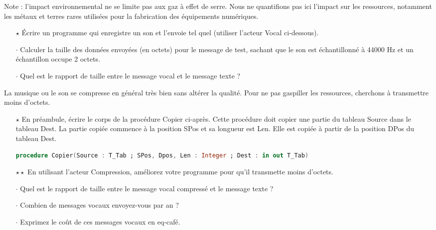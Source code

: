 \medskip

Note : l'impact environnemental ne se limite pas aux gaz à effet de serre. Nous ne quantifions pas ici l'impact sur les ressources, notamment les métaux et terres rares
utilisées pour la fabrication des équipements numériques.



\begin{itemize}
\item[$\star$] Écrire un programme qui enregistre un son et l'envoie tel quel (utiliser l'acteur Vocal ci-dessous).
\item[$\cdot$] Calculer la taille des données envoyées (en octets) pour le message de test, sachant que le son est échantillonné à 44000 Hz et un échantillon occupe 2 octets.
\item[$\cdot$] Quel est le rapport de taille entre le message vocal et le message texte ?
\end{itemize}



La musique ou le son se compresse en général très bien sans altérer la qualité.
Pour ne pas gaspiller les ressources, cherchons à transmettre moins d'octets.

\begin{itemize}
\item[$\star$] En préambule, écrire le corps de la procédure Copier ci-après. Cette procédure doit copier une partie du tableau Source dans le tableau Dest.
  La partie copiée commence à la position SPos et sa longueur est Len. Elle est copiée à partir de la position DPos du tableau Dest.

  \begin{lstlisting}[language=Ada]
    procedure Copier(Source : T_Tab ; SPos, Dpos, Len : Integer ; Dest : in out T_Tab) 
  \end{lstlisting}
  
  \item[$\star\star$] En utilisant l'acteur Compression, améliorez votre programme pour qu'il transmette moins d'octets.
\end{itemize}

\begin{itemize}
\item[$\cdot$] Quel est le rapport de taille entre le message vocal compressé et le message texte ?
\item[$\cdot$] Combien de messages vocaux envoyez-vous par an ?
\item[$\cdot$] Exprimez le coût de ces messages vocaux en eq-café.
\end{itemize}


